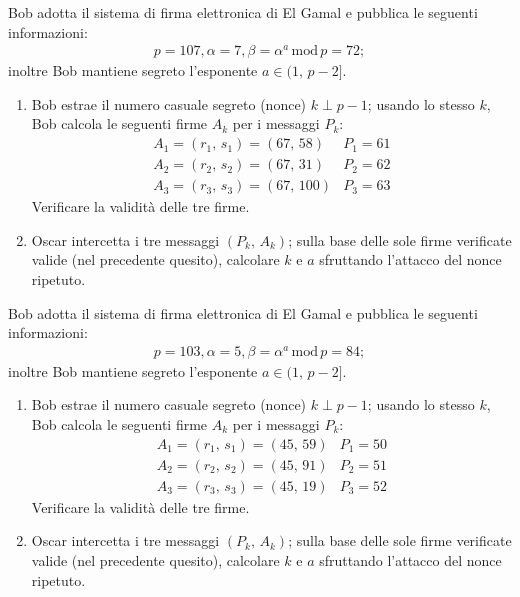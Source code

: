         Bob adotta il sistema di firma elettronica di El Gamal e pubblica le seguenti informazioni:
        \begin{gather*}
            p=107, \alpha = 7, \beta = \alpha^a\,\mathrm{mod}\,p=72
        ;\end{gather*}
        inoltre Bob mantiene segreto l'esponente $a\in (1,\,p-2]$.
        \begin{enumerate}
            \item Bob estrae il numero casuale segreto (nonce) $k\perp p-1$; usando lo stesso $k$, 
                Bob calcola le seguenti firme $A_k$ per i messaggi $P_k$:
                \[\begin{array}{ll}
                    A_1=(r_1,\,s_1)=(67,\,58) & P_1=61\\
                    A_2=(r_2,\,s_2)=(67,\,31) & P_2=62\\
                    A_3=(r_3,\,s_3)=(67,\,100) & P_3=63
                \end{array}\]
                Verificare la validità delle tre firme.
            \item Oscar intercetta i tre messaggi $(P_k,\,A_k)$; sulla base delle sole firme verificate valide 
                (nel precedente quesito), calcolare $k$ e $a$ sfruttando l'attacco del nonce ripetuto.
        \end{enumerate}

        Bob adotta il sistema di firma elettronica di El Gamal e pubblica le seguenti informazioni:
        \begin{gather*}
            p=103, \alpha = 5, \beta = \alpha^a\,\mathrm{mod}\,p=84
        ;\end{gather*}
        inoltre Bob mantiene segreto l'esponente $a\in (1,\,p-2]$.
        \begin{enumerate}
            \item Bob estrae il numero casuale segreto (nonce) $k\perp p-1$; usando lo stesso $k$, 
                Bob calcola le seguenti firme $A_k$ per i messaggi $P_k$:
                \[\begin{array}{ll}
                    A_1=(r_1,\,s_1)=(45,\,59) & P_1=50\\
                    A_2=(r_2,\,s_2)=(45,\,91) & P_2=51\\
                    A_3=(r_3,\,s_3)=(45,\,19) & P_3=52
                \end{array}\]
                Verificare la validità delle tre firme.
            \item Oscar intercetta i tre messaggi $(P_k,\,A_k)$; sulla base delle sole firme verificate valide 
                (nel precedente quesito), calcolare $k$ e $a$ sfruttando l'attacco del nonce ripetuto.
        \end{enumerate}

